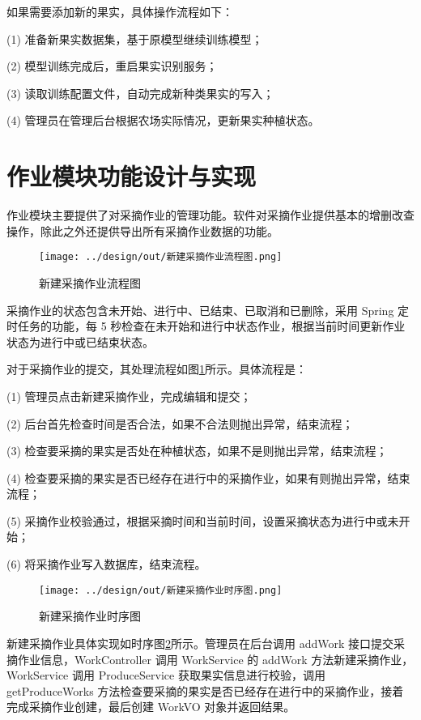 如果需要添加新的果实，具体操作流程如下：

(1) 准备新果实数据集，基于原模型继续训练模型；

(2) 模型训练完成后，重启果实识别服务；

(3) 读取训练配置文件，自动完成新种类果实的写入；

(4) 管理员在管理后台根据农场实际情况，更新果实种植状态。

\section{作业模块功能设计与实现}\label{sec:work-mode}

作业模块主要提供了对采摘作业的管理功能。软件对采摘作业提供基本的增删改查操作，除此之外还提供导出所有采摘作业数据的功能。

\begin{figure}
    \centering
    \texttt{[image: ../design/out/新建采摘作业流程图.png]}
    \caption{新建采摘作业流程图}
    \label{fig:新建采摘作业流程图}
\end{figure}

采摘作业的状态包含未开始、进行中、已结束、已取消和已删除，采用 Spring 定时任务的功能，每 5 秒检查在未开始和进行中状态作业，根据当前时间更新作业状态为进行中或已结束状态。

对于采摘作业的提交，其处理流程如图\ref{fig:新建采摘作业流程图}所示。具体流程是：

(1) 管理员点击新建采摘作业，完成编辑和提交；

(2) 后台首先检查时间是否合法，如果不合法则抛出异常，结束流程；

(3) 检查要采摘的果实是否处在种植状态，如果不是则抛出异常，结束流程；

(4) 检查要采摘的果实是否已经存在进行中的采摘作业，如果有则抛出异常，结束流程；

(5) 采摘作业校验通过，根据采摘时间和当前时间，设置采摘状态为进行中或未开始；

(6) 将采摘作业写入数据库，结束流程。

\begin{figure}
    \centering
    \texttt{[image: ../design/out/新建采摘作业时序图.png]}
    \caption{新建采摘作业时序图}
    \label{fig:新建采摘作业时序图}
\end{figure}

新建采摘作业具体实现如时序图\ref{fig:新建采摘作业时序图}所示。管理员在后台调用 addWork 接口提交采摘作业信息，WorkController 调用 WorkService 的 addWork 方法新建采摘作业，WorkService 调用 ProduceService 获取果实信息进行校验，调用 getProduceWorks 方法检查要采摘的果实是否已经存在进行中的采摘作业，接着完成采摘作业创建，最后创建 WorkVO 对象并返回结果。

